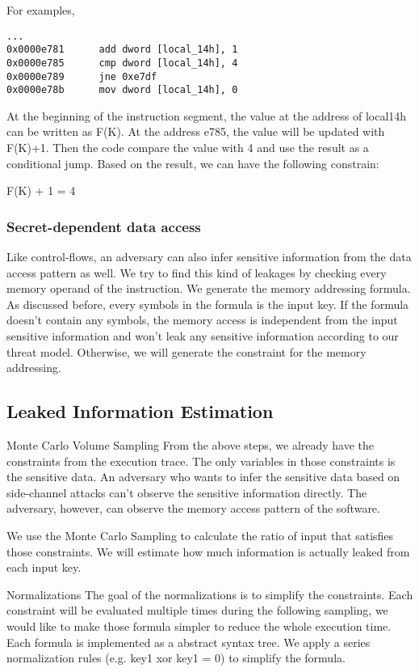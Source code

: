 For examples,

\begin{lstlisting}
...
0x0000e781      add dword [local_14h], 1
0x0000e785      cmp dword [local_14h], 4
0x0000e789      jne 0xe7df
0x0000e78b      mov dword [local_14h], 0

\end{lstlisting}

At the beginning of the instruction segment, the value at the address of local14h can be written as F(K). 
At the address e785, the value will be updated with F(K)+1. Then the code compare the value with 4 and use the 
result as a conditional jump. Based on the result, we can have the following constrain:

F(K) + 1 = 4
 
\subsubsection{Secret-dependent data access}
Like control-flows, an adversary can also infer sensitive information from the 
data access pattern as well. We try to find this kind of leakages by checking 
every memory operand of the instruction. We generate the memory addressing formula. 
As discussed before, every symbols in the formula is the input key. 
If the formula doesn’t contain any symbols, the memory access is independent 
from the input sensitive information and won’t leak any sensitive information 
according to our threat model. Otherwise, we will generate the constraint for
the memory addressing. 

\subsection{Leaked Information Estimation}
Monte Carlo Volume Sampling
From the above steps, we already have the constraints from the execution trace. 
The only variables in those constraints is the sensitive data. An adversary who 
wants to infer the sensitive data based on side-channel attacks can’t observe 
the sensitive information directly. The adversary, however, can observe the
memory access pattern of the software.  

We use the Monte Carlo Sampling to calculate the ratio of input that satisfies those constraints.
We will estimate how much information is actually leaked from each input key.

Normalizations
The goal of the normalizations is to simplify the constraints. Each constraint will be evaluated multiple times during the following sampling, we would like to make those formula simpler to reduce the whole execution time.  Each formula is implemented as a abstract syntax tree. We apply a series normalization rules (e.g. key1 xor key1 = 0) to simplify the formula.


